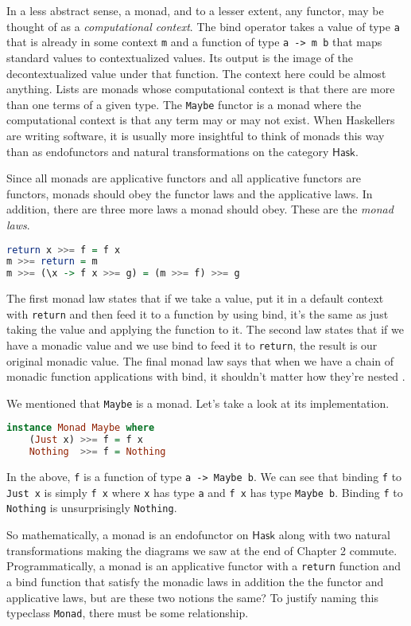 \documentclass[MS, xcolor=dvipsnames]{wfuthesis}
\def\Hask{\mathsf{Hask}}
\theoremstyle{definition}
\begin{document}
In a less abstract sense, a monad, and to a lesser extent, any functor, may be thought of as a \emph{computational context}. The bind operator takes a value of type \lstinline{a} that is already in some context \lstinline{m} and a function of type \lstinline{a -> m b} that maps standard values to contextualized values. Its output is the image of the decontextualized value under that function. The context here could be almost anything. Lists are monads whose computational context is that there are more than one terms of a given type. The \lstinline{Maybe} functor is a monad where the computational context is that any term may or may not exist. When Haskellers are writing software, it is usually more insightful to think of monads this way than as endofunctors and natural transformations on the category $\Hask$. \par
Since all monads are applicative functors and all applicative functors are functors, monads should obey the functor laws and the applicative laws. In addition, there are three more laws a monad should obey. These are the \emph{monad laws}.
\begin{lstlisting}[language=Haskell]
return x >>= f = f x
m >>= return = m
m >>= (\x -> f x >>= g) = (m >>= f) >>= g
\end{lstlisting}
The first monad law states that if we take a value, put it in a default context with \lstinline{return} and then feed it to a function by using bind, it's the same as just taking the value and applying the function to it. The second law states that if we have a monadic value and we use bind to feed it to \lstinline{return}, the result is our original monadic value. The final monad law says that when we have a chain of monadic function applications with bind, it shouldn't matter how they're nested \cite{Lipovaca2011}. \par
We mentioned that \lstinline{Maybe} is a monad. Let's take a look at its implementation.
\begin{lstlisting}[language=Haskell]
instance Monad Maybe where
    (Just x) >>= f = f x
    Nothing  >>= f = Nothing
\end{lstlisting}
In the above, \lstinline{f} is a function of type \lstinline{a -> Maybe b}. We can see that binding \lstinline{f} to \lstinline{Just x} is simply \lstinline{f x} where \lstinline{x} has type \lstinline{a} and \lstinline{f x} has type \lstinline{Maybe b}. Binding \lstinline{f} to \lstinline{Nothing} is unsurprisingly \lstinline{Nothing}. \par
So mathematically, a monad is an endofunctor on $\Hask$ along with two natural transformations making the diagrams we saw at the end of Chapter 2 commute. Programmatically, a monad is an applicative functor with a \lstinline{return} function and a bind function that satisfy the monadic laws in addition the the functor and applicative laws, but are these two notions the same? To justify naming this typeclass \lstinline{Monad}, there must be some relationship. \par
\end{document}
